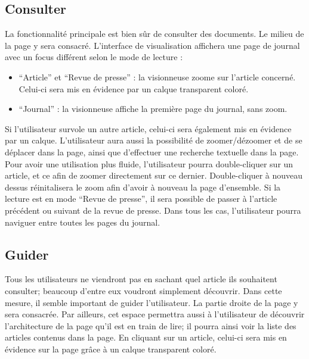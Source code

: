\subsection{Consulter}
\label{sec:consultation_consulter}
La fonctionnalité principale est bien sûr de consulter des documents. Le milieu de la page y sera consacré.
L’interface de visualisation affichera une page de journal avec un focus différent selon le mode de lecture :
\begin{itemize}
\item “Article” et “Revue de presse” : la visionneuse zoome sur l’article concerné. Celui-ci sera mis en évidence par un calque transparent coloré.
\item “Journal” : la visionneuse affiche la première page du journal, sans zoom.
\end{itemize}
\bigskip
\par
Si l’utilisateur survole un autre article, celui-ci sera également mis en évidence par un calque.
	L’utilisateur aura aussi la possibilité de zoomer/dézoomer et de se déplacer dans la page, ainsi que d’effectuer une recherche textuelle dans la page. Pour avoir une utilisation plus fluide, l'utilisateur pourra double-cliquer sur un article, et ce afin de zoomer directement sur ce dernier. Double-cliquer à nouveau dessus réinitalisera le zoom afin d'avoir à nouveau la page d'ensemble. Si la lecture est en mode “Revue de presse”, il sera possible de passer à l’article précédent ou suivant de la revue de presse. Dans tous les cas, l'utilisateur pourra naviguer entre toutes les pages du journal.

\subsection{Guider}
\label{sec:consultation_guider}

	Tous les utilisateurs ne viendront pas en sachant quel article ils souhaitent consulter; beaucoup d’entre eux voudront simplement découvrir. Dans cette mesure, il semble important de guider l’utilisateur. La partie droite de la page y sera consacrée. Par ailleurs, cet espace permettra aussi à l'utilisateur de découvrir l'architecture de la page qu'il est en train de lire; il pourra ainsi voir la liste des articles contenus dans la page. En cliquant sur un article, celui-ci sera mis en évidence sur la page grâce à un calque transparent coloré.

